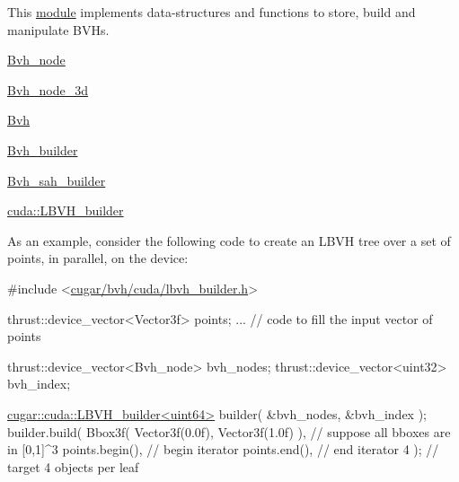 \begin{DoxyParagraph}{}
This \hyperlink{group__bvh}{module} implements data-\/structures and functions to store, build and manipulate B\+V\+Hs.
\end{DoxyParagraph}

\begin{DoxyItemize}
\item \hyperlink{structcugar_1_1_bvh__node}{Bvh\+\_\+node}
\item \hyperlink{structcugar_1_1_bvh__node__3d}{Bvh\+\_\+node\+\_\+3d}
\item \hyperlink{structcugar_1_1_bvh}{Bvh}
\item \hyperlink{classcugar_1_1_bvh__builder}{Bvh\+\_\+builder}
\item \hyperlink{classcugar_1_1_bvh__sah__builder}{Bvh\+\_\+sah\+\_\+builder}
\item \hyperlink{structcugar_1_1cuda_1_1_l_b_v_h__builder}{cuda\+::\+L\+B\+V\+H\+\_\+builder}
\end{DoxyItemize}

\begin{DoxyParagraph}{}
As an example, consider the following code to create an L\+B\+VH tree over a set of points, in parallel, on the device\+: 
\begin{DoxyCode}
\textcolor{preprocessor}{#include <\hyperlink{lbvh__builder_8h}{cugar/bvh/cuda/lbvh\_builder.h}>}

thrust::device\_vector<Vector3f> points;
... \textcolor{comment}{// code to fill the input vector of points}

thrust::device\_vector<Bvh\_node> bvh\_nodes;
thrust::device\_vector<uint32>   bvh\_index;

\hyperlink{structcugar_1_1cuda_1_1_l_b_v_h__builder}{cugar::cuda::LBVH\_builder<uint64>} builder( &bvh\_nodes, &bvh\_index );
builder.build(
    Bbox3f( Vector3f(0.0f), Vector3f(1.0f) ),   \textcolor{comment}{// suppose all bboxes are in [0,1]^3}
    points.begin(),                             \textcolor{comment}{// begin iterator}
    points.end(),                               \textcolor{comment}{// end iterator}
    4 );                                        \textcolor{comment}{// target 4 objects per leaf}
\end{DoxyCode}
 
\end{DoxyParagraph}
